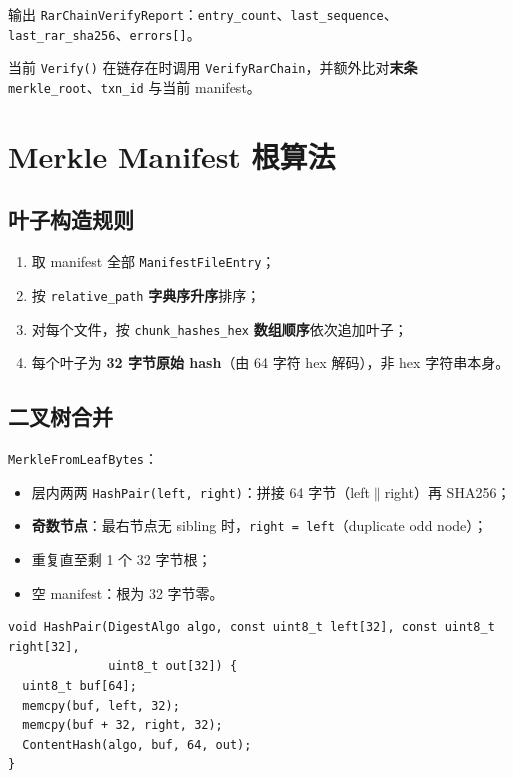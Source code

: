 输出 \texttt{RarChainVerifyReport}：\texttt{entry\_count}、\texttt{last\_sequence}、\texttt{last\_rar\_sha256}、\texttt{errors[]}。

当前 \texttt{Verify()} 在链存在时调用 \texttt{VerifyRarChain}，并额外比对\textbf{末条} \texttt{merkle\_root}、\texttt{txn\_id} 与当前 manifest。

\section{Merkle Manifest 根算法}

\subsection{叶子构造规则}

\begin{designbox}
\begin{enumerate}[nosep]
  \item 取 manifest 全部 \texttt{ManifestFileEntry}；
  \item 按 \texttt{relative\_path} \textbf{字典序升序}排序；
  \item 对每个文件，按 \texttt{chunk\_hashes\_hex} \textbf{数组顺序}依次追加叶子；
  \item 每个叶子为 \textbf{32 字节原始 hash}（由 64 字符 hex 解码），非 hex 字符串本身。
\end{enumerate}
\end{designbox}

\subsection{二叉树合并}

\texttt{MerkleFromLeafBytes}：
\begin{itemize}[nosep]
  \item 层内两两 \texttt{HashPair(left, right)}：拼接 64 字节（left$\|$right）再 SHA256；
  \item \textbf{奇数节点}：最右节点无 sibling 时，\texttt{right = left}（duplicate odd node）；
  \item 重复直至剩 1 个 32 字节根；
  \item 空 manifest：根为 32 字节零。
\end{itemize}

\begin{lstlisting}[caption={HashPair},label={lst:hash-pair}]
void HashPair(DigestAlgo algo, const uint8_t left[32], const uint8_t right[32],
              uint8_t out[32]) {
  uint8_t buf[64];
  memcpy(buf, left, 32);
  memcpy(buf + 32, right, 32);
  ContentHash(algo, buf, 64, out);
}
\end{lstlisting}


